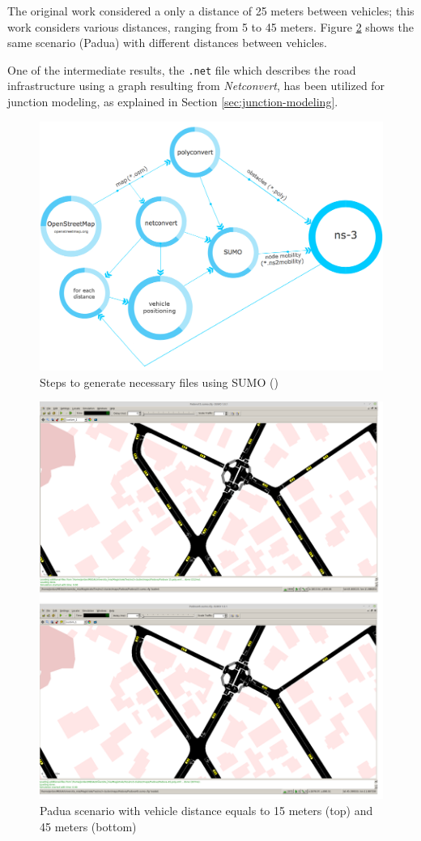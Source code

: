 		The original work considered a only a distance of 25 meters between vehicles; this work considers various distances, ranging from 5 to 45 meters. Figure \ref{fig:sumo-distances}  shows the same scenario (Padua) with different distances between vehicles.
		
		
		One of the intermediate results, the \texttt{.net} file which describes the road infrastructure using a graph resulting from \textit{Netconvert}, has been utilized for junction modeling, as explained in Section \ref{sec:junction-modeling}.
		\begin{figure}[H]
			\centering
			\includegraphics[width=\textwidth]{immagini/sumo-process}
			\caption{Steps to generate necessary files using SUMO (\cite{ROM2017})}
			\label{fig:sumo-process}
		\end{figure}
		
		\begin{figure}[H]
			\centering
			\includegraphics[width=\textwidth]{immagini/sumo-distances}
			\caption{Padua scenario with vehicle distance equals to 15 meters (top) and 45 meters (bottom)}
			\label{fig:sumo-distances}
		\end{figure}
